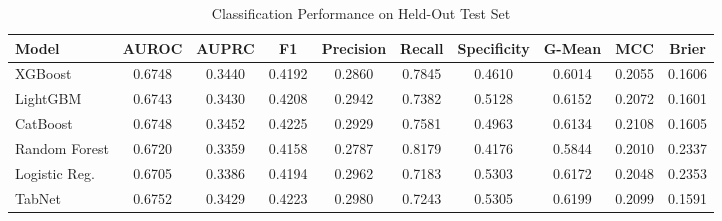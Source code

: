 \begin{table}
\centering
\caption{Classification Performance on Held-Out Test Set}
\label{tab:results}
\begin{tabular}{lccccccccc}
\toprule
Model & AUROC & AUPRC & F1 & Precision & Recall & Specificity & G-Mean & MCC & Brier \\
\midrule
XGBoost & 0.6748 & 0.3440 & 0.4192 & 0.2860 & 0.7845 & 0.4610 & 0.6014 & 0.2055 & 0.1606 \\
LightGBM & 0.6743 & 0.3430 & 0.4208 & 0.2942 & 0.7382 & 0.5128 & 0.6152 & 0.2072 & 0.1601 \\
CatBoost & 0.6748 & 0.3452 & 0.4225 & 0.2929 & 0.7581 & 0.4963 & 0.6134 & 0.2108 & 0.1605 \\
Random Forest & 0.6720 & 0.3359 & 0.4158 & 0.2787 & 0.8179 & 0.4176 & 0.5844 & 0.2010 & 0.2337 \\
Logistic Reg. & 0.6705 & 0.3386 & 0.4194 & 0.2962 & 0.7183 & 0.5303 & 0.6172 & 0.2048 & 0.2353 \\
TabNet & 0.6752 & 0.3429 & 0.4223 & 0.2980 & 0.7243 & 0.5305 & 0.6199 & 0.2099 & 0.1591 \\
\bottomrule
\end{tabular}
\end{table}
